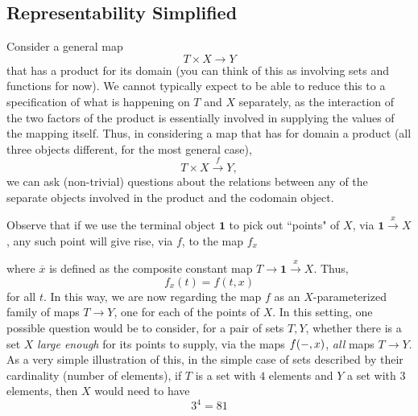 \documentclass[a4paper]{book}
\theoremstyle{definition}
\theoremstyle{definition}
\theoremstyle{definition}
\theoremstyle{theorem}
\theoremstyle{definition}
\begin{document}
\subsection{Representability Simplified} 
Consider a general map   
\begin{equation*}
T \times X \rightarrow Y
\end{equation*}
that has a product for its domain (you can think of this as involving sets and functions for now). We cannot typically expect to be able to reduce this to a specification of what is happening on $T$ and $X$ separately, as the interaction of the two factors of the product is essentially involved in supplying the values of the mapping itself. Thus, in considering a map that has for domain a product (all three objects different, for the most general case), 
\begin{equation*}
T \times X \xrightarrow{f} Y, 
\end{equation*}
we can ask (non-trivial) questions about the relations between any of the separate objects involved in the product and the codomain object.  \par 
Observe that if we use the terminal object $\textbf{1}$ to pick out ``points" of $X$, via 
$\textbf{1} \xrightarrow{x} X$, any such point will give rise, via $f$, to the map $f_x$
\begin{center}
\end{center}  
where $\overline{x}$ is defined as the composite constant map $T \rightarrow \textbf{1} \xrightarrow{x} X$. Thus, 
\begin{equation*}
f_x(t) = f(t, x)
\end{equation*}
for all $t$. In this way, we are now regarding the map $f$ as an $X$-parameterized family of maps $T \rightarrow Y$, one for each of the points of $X$. In this setting, one possible question would be to consider, for a pair of sets $T, Y$, whether there is a set $X$ \textit{large enough} for its points to supply, via the maps $f(\--, x)$, \textit{all} maps $T \rightarrow Y$. As a very simple illustration of this, in the simple case of sets described by their cardinality (number of elements), if $T$ is a set with $4$ elements and $Y$ a set with $3$ elements, then $X$ would need to have 
\begin{equation*}
3^4 = 81
\end{equation*} 
\end{document}
